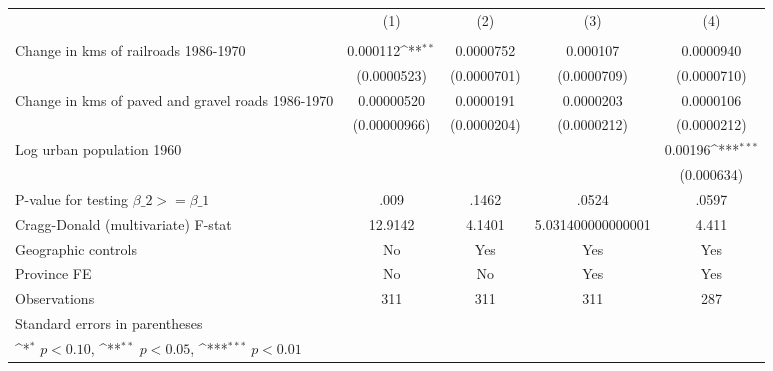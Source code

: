{
\def\sym#1{\ifmmode^{#1}\else\(^{#1}\)\fi}
\begin{tabular}{l*{4}{c}}
\hline\hline
                &\multicolumn{1}{c}{(1)}&\multicolumn{1}{c}{(2)}&\multicolumn{1}{c}{(3)}&\multicolumn{1}{c}{(4)}\\
                &\multicolumn{1}{c}{}&\multicolumn{1}{c}{}&\multicolumn{1}{c}{}&\multicolumn{1}{c}{}\\
\hline
Change in kms of railroads 1986-1970& 0.000112\sym{**} &0.0000752         & 0.000107         &0.0000940         \\
                &(0.0000523)         &(0.0000701)         &(0.0000709)         &(0.0000710)         \\
[1em]
Change in kms of paved and gravel roads 1986-1970&0.00000520         &0.0000191         &0.0000203         &0.0000106         \\
                &(0.00000966)         &(0.0000204)         &(0.0000212)         &(0.0000212)         \\
[1em]
Log urban population 1960&                  &                  &                  &  0.00196\sym{***}\\
                &                  &                  &                  &(0.000634)         \\
\hline
P-value for testing $\beta\_{2} >= \beta\_{1}$&     .009         &    .1462         &    .0524         &    .0597         \\
Cragg-Donald (multivariate) F-stat&  12.9142         &   4.1401         &5.031400000000001         &    4.411         \\
Geographic controls&       No         &      Yes         &      Yes         &      Yes         \\
Province FE     &       No         &       No         &      Yes         &      Yes         \\
Observations    &      311         &      311         &      311         &      287         \\
\hline\hline
\multicolumn{5}{l}{\footnotesize Standard errors in parentheses}\\
\multicolumn{5}{l}{\footnotesize \sym{*} \(p<0.10\), \sym{**} \(p<0.05\), \sym{***} \(p<0.01\)}\\
\end{tabular}
}
